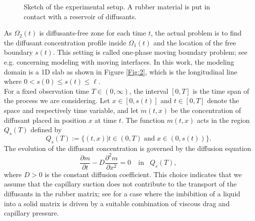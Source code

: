\documentclass{article}
\begin{document}
\begin{figure}[h]
\begin{center}
		\caption{Sketch of the experimental setup. A rubber material is put in contact with a reservoir of diffusants.}
		\label{Fig:1}
	\end{center}
\end{figure}

As $\Omega_2(t)$ is diffusants-free zone for each time $t$,  the actual  problem is to find the  diffusant concentration profile inside $\Omega_1(t)$ and the location of the free boundary $s(t)$.  This setting is called  one-phase moving boundary problem; see e.g. \cite{gupta2017classical} concerning modeling with moving interfaces. 
In this work, the modeling domain is a 1D slab as shown in Figure \ref{Fig:2}, which is the longitudinal line where  $0<s(0)\leq s(t)\leq \ell$.\\
For  a fixed observation time $T\in (0, \infty)$, the interval $[0, T]$ is the time span of the process we are considering.  Let  $x\in [0, s(t)]$ and $t \in [0, T]$ denote the space and respectively time variable,  and let $m(t, x)$  be the concentration of diffusant placed in position $x$ at time  $t$. %
The function $m(t, x)$ acts in the region $Q_s(T)$ defined by $$ Q_s(T):= \{ (t, x) | t \in (0, T) \; \text{and}\; x \in (0, s(t))\}.$$
The evolution of the diffusant concentration  is governed by the diffusion equation
\begin{equation} 
\label{a11} 
\displaystyle \frac{\partial m}{\partial t} -D \frac{\partial^2 m}{\partial x^2} = 0\;\;\; \ \text{in}\;\;\; Q_s(T),
\end{equation}
where $D>0$ is the constant diffusion coefficient. This choice indicates that we assume that the capillary suction does not  contribute to the transport of the diffusants in the rubber matrix; see \cite{Hewitt} for a case where the imbibition of a liquid into a solid matrix is driven by a suitable combination of viscous drag and capillary pressure. 
\end{document}
